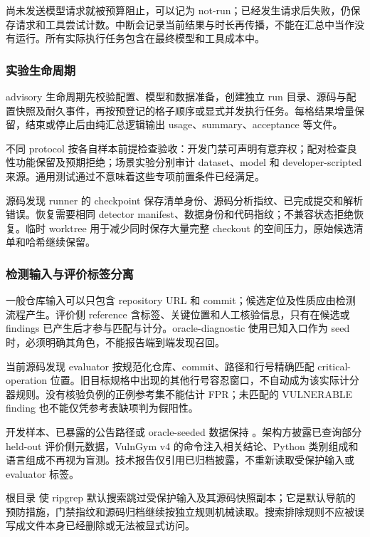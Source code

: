 尚未发送模型请求就被预算阻止，可以记为 not-run；已经发生请求后失败，仍保存请求和工具尝试计数。中断会记录当前结果与时长再传播，不能在汇总中当作没有运行。所有实际执行任务包含在最终模型和工具成本中。

\subsubsection{实验生命周期}
advisory 生命周期先校验配置、模型和数据准备，创建独立 run 目录、源码与配置快照及耐久事件，再按预登记的格子顺序或显式并发执行任务。每格结果增量保留，结束或停止后由纯汇总逻辑输出 usage、summary、acceptance 等文件。

不同 protocol 按各自样本前提检查验收：开发门禁可声明有意弃权；配对检查良性功能保留及预期拒绝；场景实验分别审计 dataset、model 和 developer-scripted 来源。通用测试通过不意味着这些专项前置条件已经满足。

源码发现 runner 的 checkpoint 保存清单身份、源码分析指纹、已完成提交和解析错误。恢复需要相同 detector manifest、数据身份和代码指纹；不兼容状态拒绝恢复。临时 worktree 用于减少同时保存大量完整 checkout 的空间压力，原始候选清单和哈希继续保留。

\subsubsection{检测输入与评价标签分离}
一般仓库输入可以只包含 repository URL 和 commit；候选定位及性质应由检测流程产生。评价侧 reference 含标签、关键位置和人工核验信息，只有在候选或 findings 已产生后才参与匹配与计分。oracle-diagnostic 使用已知入口作为 seed 时，必须明确其角色，不能报告端到端发现召回。

当前源码发现 evaluator 按规范化仓库、commit、路径和行号精确匹配 critical-operation 位置。旧目标规格中出现的其他行号容忍窗口，不自动成为该实际计分器规则。没有核验负例的正例参考集不能估计 FPR；未匹配的 VULNERABLE finding 也不能仅凭参考表缺项判为假阳性。

开发样本、已暴露的公告路径或 oracle-seeded 数据保持 。架构方披露已查询部分 held-out 评价侧元数据，VulnGym v4 的命令注入相关结论、Python 类别组成和语言组成不再视为盲测。技术报告仅引用已归档披露，不重新读取受保护输入或 evaluator 标签。\cite{disclosure}

根目录  使 ripgrep 默认搜索跳过受保护输入及其源码快照副本；它是默认导航的预防措施，门禁指纹和源码归档继续按独立规则机械读取。搜索排除规则不应被误写成文件本身已经删除或无法被显式访问。


